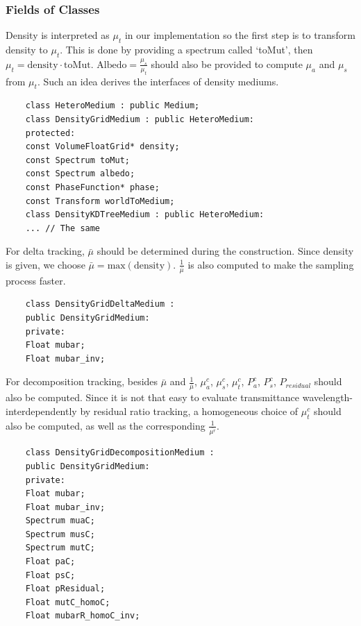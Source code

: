 \documentclass[acmtog]{acmart}
\begin{document}
\subsubsection{Fields of Classes}
Density is interpreted as $\mu_t$ in our implementation so the first step is to transform density to $\mu_t$.
This is done by providing a spectrum called `toMut', then $\mu_t=\mathrm{density\cdot toMut}$.
$\mathrm{Albedo}=\frac{\mu_s}{\mu_t}$ should also be provided to compute $\mu_a$ and $\mu_s$ from $\mu_t$.
Such an idea derives the interfaces of density mediums.
\begin{lstlisting}
	class HeteroMedium : public Medium;
	class DensityGridMedium : public HeteroMedium:
	protected:
	const VolumeFloatGrid* density;
	const Spectrum toMut;
	const Spectrum albedo;
	const PhaseFunction* phase;
	const Transform worldToMedium;
	class DensityKDTreeMedium : public HeteroMedium:
	... // The same
\end{lstlisting}
For delta tracking, $\bar{\mu}$ should be determined during the construction.
Since density is given, we choose $\bar{\mu}=\mathrm{max}(\mathrm{density})$.
$\frac{1}{\bar{\mu}}$ is also computed to make the sampling process faster.
\begin{lstlisting}
	class DensityGridDeltaMedium : 
	public DensityGridMedium:
	private:
	Float mubar;
	Float mubar_inv;
\end{lstlisting}
For decomposition tracking, besides $\bar{\mu}$ and $\frac{1}{\bar{\mu}}$, 
$\mu_a^c$, $\mu_s^c$, $\mu_t^c$, $P_a^c$, $P_s^c$, $P_{residual}$ should also be computed.
Since it is not that easy to evaluate transmittance wavelength-interdependently by residual ratio tracking, 
a homogeneous choice of $\mu_t^c$ should also be computed, as well as the corresponding $\frac{1}{\bar{\mu^r}}$.
\begin{lstlisting}
	class DensityGridDecompositionMedium : 
	public DensityGridMedium:
	private:
	Float mubar;
	Float mubar_inv;
	Spectrum muaC;
	Spectrum musC;
	Spectrum mutC;
	Float paC;
	Float psC;
	Float pResidual;
	Float mutC_homoC;
	Float mubarR_homoC_inv;
\end{lstlisting}
\end{document}
